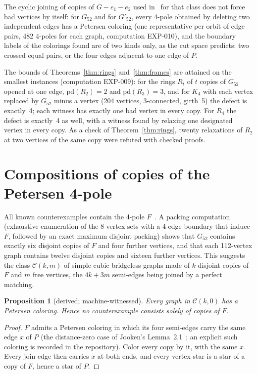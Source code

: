 \documentclass[11pt]{article}
\newtheorem{proposition}[theorem]{Proposition}
\theoremstyle{definition}
\theoremstyle{remark}
\newcommand{\PG}{P}
\newcommand{\Gfty}{G_{52}}
\newcommand{\Gftyb}{G'_{52}}
\newcommand{\pd}{\mathrm{pd}}
\begin{document}
The cyclic joining of copies of $G - e_1 - e_2$ used
in~\cite{MMM2021} for that class does not force bad vertices by itself: for $\Gfty$ and for
$\Gftyb$, every 4-pole obtained by deleting two independent edges has a Petersen coloring (one
representative per orbit of edge pairs, 482 4-poles for each graph, computation EXP-010), and the boundary
labels of the colorings found are of two kinds only, as the cut space predicts: two crossed equal
pairs, or the four edges adjacent to one edge of $\PG$.

The bounds of Theorems~\ref{thm:rings} and~\ref{thm:frames} are attained on the smallest
instances (computation EXP-009): for the rings $R_t$ of $t$ copies of $\Gfty$ opened at one edge,
$\pd(R_2) = 2$ and $\pd(R_3) = 3$, and for $K_4$ with each vertex replaced by $\Gfty$ minus a
vertex (204 vertices, 3-connected, girth~5) the defect is exactly~4; each witness has exactly one
bad vertex in every copy. For $R_4$ the defect is exactly~4 as well, with a witness found by relaxing one designated vertex in every copy. As a check of Theorem~\ref{thm:rings}, twenty relaxations of
$R_2$ at two vertices of the same copy were refuted with checked proofs.

\section{Compositions of copies of the Petersen 4-pole}\label{sec:compositions}

All known counterexamples contain the 4-pole $F$~\cite{GJMMM2026}. A packing computation
(exhaustive enumeration of the 8-vertex sets with a 4-edge boundary that induce $F$, followed by
an exact maximum disjoint packing) shows that $\Gfty$ contains exactly six disjoint copies of $F$
and four further vertices, and that each 112-vertex graph contains twelve disjoint copies and
sixteen further vertices. This suggests the class $\mathcal C(k, m)$ of simple cubic bridgeless
graphs made of $k$ disjoint copies of $F$ and $m$ free vertices, the $4k + 3m$ semi-edges being
joined by a perfect matching.

\begin{proposition}[derived; machine-witnessed]\label{prop:pure}
Every graph in $\mathcal C(k, 0)$ has a Petersen coloring. Hence no counterexample consists
solely of copies of $F$.
\end{proposition}

\begin{proof}
$F$ admits a Petersen coloring in which its four semi-edges carry the same edge $x$ of $\PG$
(the distance-zero case of Jooken's Lemma~2.1~\cite{Jooken2026}; an explicit such coloring is
recorded in the repository). Color every copy by it, with the same $x$. Every join edge then
carries $x$ at both ends, and every vertex star is a star of a copy of $F$, hence a star of
$\PG$.
\end{proof}
\end{document}
